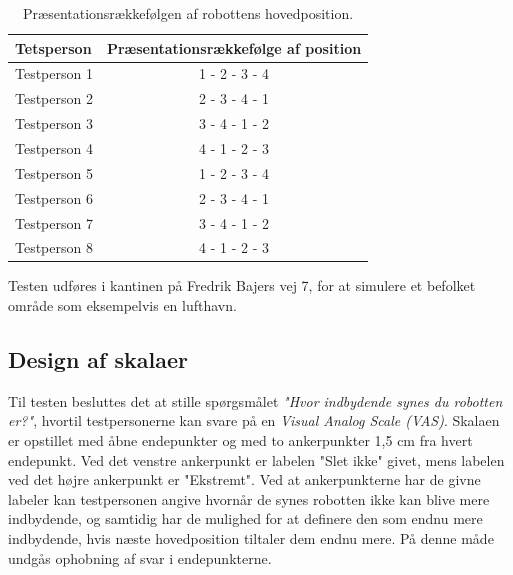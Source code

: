 \begin{table}[H]
	\centering
	\begin{tabular}{l|c}
		Tetsperson     & Præsentationsrækkefølge af position \\\hline
		Testperson 1   & 1 - 2 - 3 - 4          \\\hline
		Testperson 2   & 2 - 3 - 4 - 1          \\\hline
		Testperson 3   & 3 - 4 - 1 - 2          \\\hline
		Testperson 4   & 4 - 1 - 2 - 3          \\\hline
		Testperson 5   & 1 - 2 - 3 - 4          \\\hline
		Testperson 6   & 2 - 3 - 4 - 1          \\\hline
		Testperson 7   & 3 - 4 - 1 - 2          \\\hline
		Testperson 8   & 4 - 1 - 2 - 3   
	\end{tabular}
	\caption{Præsentationsrækkefølgen af robottens hovedposition.}
	\label{tab:Latin}         
\end{table}
\noindent
%
Testen udføres i kantinen på Fredrik Bajers vej 7, for at simulere et befolket område som eksempelvis en lufthavn. 

\subsection*{Design af skalaer}
%
Til testen besluttes det at stille spørgsmålet \textit{"Hvor indbydende synes du robotten er?"}, hvortil testpersonerne kan svare på en \textit{Visual Analog Scale (VAS)}. Skalaen er opstillet med åbne endepunkter og med to ankerpunkter 1,5 cm fra hvert endepunkt. Ved det venstre ankerpunkt er labelen "Slet ikke" givet, mens labelen ved det højre ankerpunkt er "Ekstremt". Ved at ankerpunkterne har de givne labeler kan testpersonen angive hvornår de synes robotten ikke kan blive mere indbydende, og samtidig har de mulighed for at definere den som endnu mere indbydende, hvis næste hovedposition tiltaler dem endnu mere. På denne måde undgås ophobning af svar i endepunkterne.

